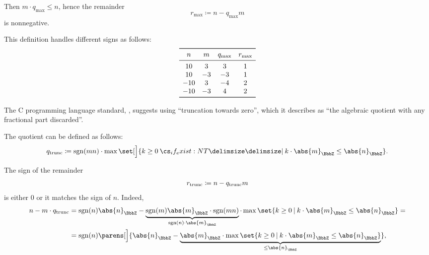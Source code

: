 \begin{remark}
\begin{thmenum}
    Then \( m \cdot q_{\max} \leq n \), hence the remainder
    \begin{equation*}
      r_{\max} \coloneqq n - q_{\max} m
    \end{equation*}
    is nonnegative.

    This definition handles different signs as follows:
    \begin{equation*}
      \begin{array}{*{4}{c}}
        \toprule
        n   & m  & q_{\max} & r_{\max} \\
        \midrule
        10  & 3  & 3        & 1        \\
        10  & -3 & -3       & 1        \\
        -10 & 3  & -4       & 2        \\
        -10 & -3 & 4        & 2        \\
        \bottomrule
      \end{array}
    \end{equation*}

     The C programming language standard, \cite[66]{ISO:9899:2018}, suggests using \enquote{truncation towards zero}, which it describes as \enquote{the algebraic quotient with any fractional part discarded}.

    The quotient can be defined as follows:
    \begin{equation}\label{eq:rem:integer_division_uniqueness/trunc/q}
      q_{\T{trunc}} \coloneqq \sgn(mn) \cdot \max\set[\Big]{ k \geq 0 \given* k \cdot \abs{m}_\BbbZ \leq \abs{n}_\BbbZ }.
    \end{equation}

    The sign of the remainder
    \begin{equation*}
      r_{\T{trunc}} \coloneqq n - q_{\T{trunc}} m
    \end{equation*}
    is either \( 0 \) or it matches the sign of \( n \). Indeed,
    \begin{align*}
      n - m \cdot q_{\T{trunc}}
      &=
      \sgn(n) \abs{n}_\BbbZ - \underbrace{\sgn(m) \abs{m}_\BbbZ \cdot \sgn(mn)}_{\sgn(n) \cdot \abs{m}_\BbbZ} \cdot \max\set{ k \geq 0 \given k \cdot \abs{m}_\BbbZ \leq \abs{n}_\BbbZ }
      = \\ &=
      \sgn(n) \parens[\Big]{ \abs{n}_\BbbZ - \underbrace{\abs{m}_\BbbZ \cdot \max\set{ k \geq 0 \given k \cdot \abs{m}_\BbbZ \leq \abs{n}_\BbbZ }}_{\leq \abs{n}_\BbbZ} },
    \end{align*}


\end{thmenum}
\end{remark}
